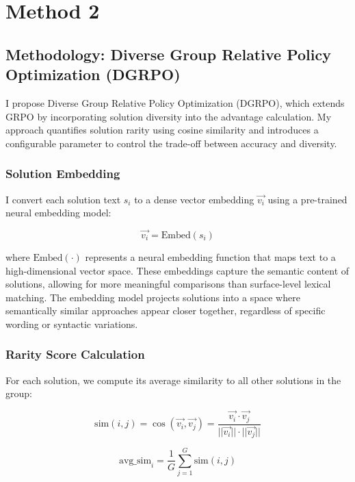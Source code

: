\documentclass[10pt,twocolumn,letterpaper]{article}
\begin{document}
\section{Method 2}

\subsection{Methodology: Diverse Group Relative Policy Optimization (DGRPO)}
I propose Diverse Group Relative Policy Optimization (DGRPO), which extends GRPO by incorporating solution diversity into the advantage calculation. My approach quantifies solution rarity using cosine similarity and introduces a configurable parameter to control the trade-off between accuracy and diversity.

\subsubsection{Solution Embedding}
I convert each solution text $s_i$ to a dense vector embedding $\vec{v_i}$ using a pre-trained neural embedding model:

\begin{equation}
\vec{v_i} = \text{Embed}(s_i)
\end{equation}

where $\text{Embed}(\cdot)$ represents a neural embedding function that maps text to a high-dimensional vector space. These embeddings capture the semantic content of solutions, allowing for more meaningful comparisons than surface-level lexical matching. The embedding model projects solutions into a space where semantically similar approaches appear closer together, regardless of specific wording or syntactic variations.

\subsubsection{Rarity Score Calculation}
For each solution, we compute its average similarity to all other solutions in the group:

\begin{equation}
\text{sim}(i, j) = \cos(\vec{v_i}, \vec{v_j}) = \frac{\vec{v_i} \cdot \vec{v_j}}{||\vec{v_i}|| \cdot ||\vec{v_j}||}
\end{equation}

\begin{equation}
\text{avg\_sim}_i = \frac{1}{G} \sum_{j=1}^{G} \text{sim}(i, j)
\end{equation}
\end{document}
